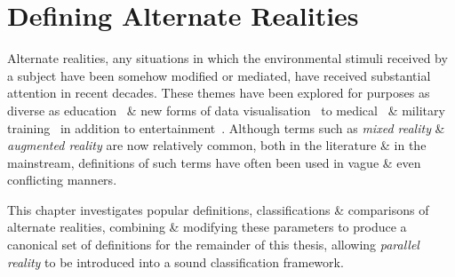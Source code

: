 


\section{Defining Alternate Realities}

Alternate realities, any situations in which the environmental stimuli received by a subject have been somehow modified or mediated, have received substantial attention in recent decades. These themes have been explored for purposes as diverse as education~\cite{Warburton2009} \& new forms of data visualisation~\cite{Coleman2009} to medical~\cite{TenEyck2011} \& military training~\cite{Qiu2009} in addition to entertainment~\cite{Scherrer2008}. Although terms such as \textit{mixed reality} \& \textit{augmented reality} are now relatively common, both in the literature \& in the mainstream, definitions of such terms have often been used in vague \& even conflicting manners.

This chapter investigates popular definitions, classifications \& comparisons of alternate realities, combining \& modifying these parameters to produce a canonical set of definitions for the remainder of this thesis, allowing \textit{parallel reality} to be introduced into a sound classification framework.

